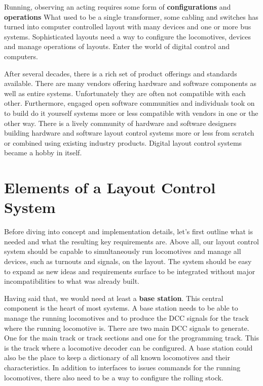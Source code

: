 Running, observing an acting requires some form of {\bf configurations} and {\bf operations} What used to be a single transformer, some cabling and switches has turned into computer controlled layout with many devices and one or more bus systems. Sophisticated layouts need a way to configure the locomotives, devices and manage operations of layouts. Enter the world of digital control and computers.

After several decades, there is a rich set of product offerings and standards available. There are many vendors offering hardware and software components as well as entire systems. Unfortunately they are often not compatible with each other. Furthermore, engaged open software communities and individuals took on to build do it yourself systems more or less compatible with vendors in one or the other way. There is a lively community of hardware and software designers building hardware and software layout control systems more or less from scratch or combined using existing industry products. Digital layout control systems became a hobby in itself.

\section*{Elements of a Layout Control System}

Before diving into concept and implementation details, let's first outline what is needed and what the resulting key requirements are. Above all, our layout control system should be capable to simultaneously run locomotives and manage all devices, such as turnouts and signals, on the layout. The system should be easy to expand as new ideas and requirements surface to be integrated without major incompatibilities to what was already built.

Having said that, we would need at least a {\bf base station}. This central component is the heart of most systems. A base station needs to be able to manage the running locomotives and to produce the DCC signals for the track where the running locomotive is. There are two main DCC signals to generate. One for the main track or track sections and one for the programming track. This is the track where a locomotive decoder can be configured. A base station could also be the place to keep a dictionary of all known locomotives and their characteristics. In addition to interfaces to issues commands for the running locomotives, there also need to be a way to configure the rolling stock.


